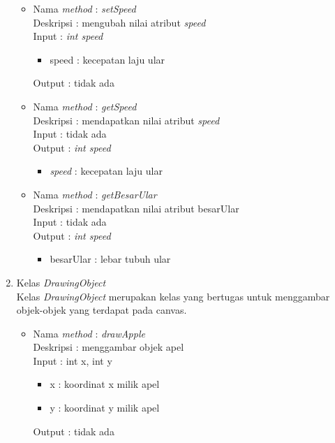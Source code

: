 \begin{enumerate}
\begin{itemize}
			\item Nama \textit{method} : \textit{setSpeed}\\
				  Deskripsi : mengubah nilai atribut \textit{speed}\\
				  Input : \textit{int speed}
				  	\begin{itemize}
				  		\item speed : kecepatan laju ular
				  	\end{itemize}
				  Output : tidak ada
				  
			\item Nama \textit{method} : \textit{getSpeed}\\
				  Deskripsi : mendapatkan nilai atribut \textit{speed}\\
				  Input : tidak ada\\
				  Output : \textit{int speed}
				  	\begin{itemize}
				  		\item \textit{speed} : kecepatan laju ular
				  	\end{itemize}
				  	
			\item Nama \textit{method} : \textit{getBesarUlar}\\
				  Deskripsi : mendapatkan nilai atribut besarUlar\\
				  Input : tidak ada\\
				  Output : \textit{int speed}
				  	\begin{itemize}
				  		\item besarUlar : lebar tubuh ular
				  	\end{itemize}
		\end{itemize}
		
	\item Kelas \textit{DrawingObject}\\
	Kelas \textit{DrawingObject} merupakan kelas yang bertugas untuk menggambar objek-objek yang terdapat pada canvas.
	
		\begin{itemize}
			\item Nama \textit{method} : \textit{drawApple}\\
				  Deskripsi : menggambar objek apel\\
				  Input : int x, int y
				  	\begin{itemize}
				  		\item x : koordinat x milik apel
				  		\item y : koordinat y milik apel
				  	\end{itemize}
				  Output : tidak ada\\
				  

\end{itemize}
\end{enumerate}

